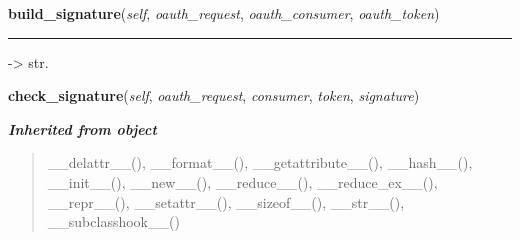     \label{lib:oauth:OAuthSignatureMethod:build_signature}

    \vspace{0.5ex}

\hspace{.8\funcindent}\begin{boxedminipage}{\funcwidth}

    \raggedright \textbf{build\_signature}(\textit{self}, \textit{oauth\_request}, \textit{oauth\_consumer}, \textit{oauth\_token})

    \vspace{-1.5ex}

    \rule{\textwidth}{0.5\fboxrule}
\setlength{\parskip}{2ex}
    -{\textgreater} str.

\setlength{\parskip}{1ex}
    \end{boxedminipage}

    \label{lib:oauth:OAuthSignatureMethod:check_signature}

    \vspace{0.5ex}

\hspace{.8\funcindent}\begin{boxedminipage}{\funcwidth}

    \raggedright \textbf{check\_signature}(\textit{self}, \textit{oauth\_request}, \textit{consumer}, \textit{token}, \textit{signature})

\setlength{\parskip}{2ex}
\setlength{\parskip}{1ex}
    \end{boxedminipage}


\large{\textbf{\textit{Inherited from object}}}

\begin{quote}
\_\_delattr\_\_(), \_\_format\_\_(), \_\_getattribute\_\_(), \_\_hash\_\_(), \_\_init\_\_(), \_\_new\_\_(), \_\_reduce\_\_(), \_\_reduce\_ex\_\_(), \_\_repr\_\_(), \_\_setattr\_\_(), \_\_sizeof\_\_(), \_\_str\_\_(), \_\_subclasshook\_\_()
\end{quote}


